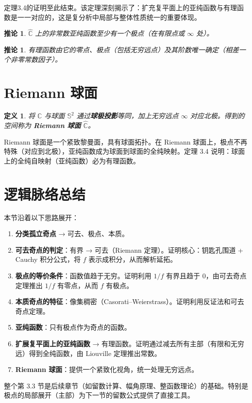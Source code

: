 \documentclass[UTF8]{ctexart}
\newtheorem{definition}[theorem]{定义}
\newtheorem{corollary}[theorem]{推论}
\numberwithin{equation}{section}
\newcommand{\CC}{\mathbb{C}}
\begin{document}
定理3.4的证明至此结束。该定理深刻揭示了：扩充复平面上的亚纯函数与有理函数是一一对应的，这是复分析中局部与整体性质统一的重要体现。



\begin{corollary}
$\widehat{\CC}$ 上的非常数亚纯函数至少有一个极点（在有限点或 $\infty$ 处）。
\end{corollary}


\begin{corollary}
有理函数由它的零点、极点（包括无穷远点）及其阶数唯一确定（相差一个非零常数因子）。
\end{corollary}

\section{Riemann 球面}
\begin{definition}
将 \(\CC\) 与球面 \(\mathbb{S}^2\) 通过\textbf{球极投影}等同，加上无穷远点 \(\infty\) 对应北极。得到的空间称为 \textbf{Riemann 球面} \(\widehat{\CC}\)。
\end{definition}

Riemann 球面是一个紧致黎曼面，具有球面拓扑。在 Riemann 球面上，极点不再特殊（对应到北极），亚纯函数成为球面到球面的全纯映射。定理 3.4 说明：球面上的全纯自映射（亚纯函数）必为有理函数。

\section{逻辑脉络总结}
本节沿着以下思路展开：
\begin{enumerate}
\item \textbf{分类孤立奇点} → 可去、极点、本质。
\item \textbf{可去奇点的判定}：有界 → 可去（Riemann 定理）。证明核心：钥匙孔围道 + Cauchy 积分公式，将 \(f\) 表示成积分，从而解析延拓。
\item \textbf{极点的等价条件}：函数值趋于无穷。证明利用 \(1/f\) 有界且趋于 0，由可去奇点定理推出 \(1/f\) 有零点，从而 \(f\) 有极点。
\item \textbf{本质奇点的特征}：像集稠密（Casorati–Weierstrass）。证明利用反证法和可去奇点定理。
\item \textbf{亚纯函数}：只有极点作为奇点的函数。
\item \textbf{扩展复平面上的亚纯函数} → 有理函数。证明通过减去所有主部（有限和无穷远）得到全纯函数，由 Liouville 定理推出常数。
\item \textbf{Riemann 球面}：提供一个紧致化视角，统一处理无穷远点。
\end{enumerate}

整个第 3.3 节是后续章节（如留数计算、幅角原理、整函数理论）的基础。特别是极点的局部展开（主部）为下一节的留数公式提供了直接工具。
\end{document}
